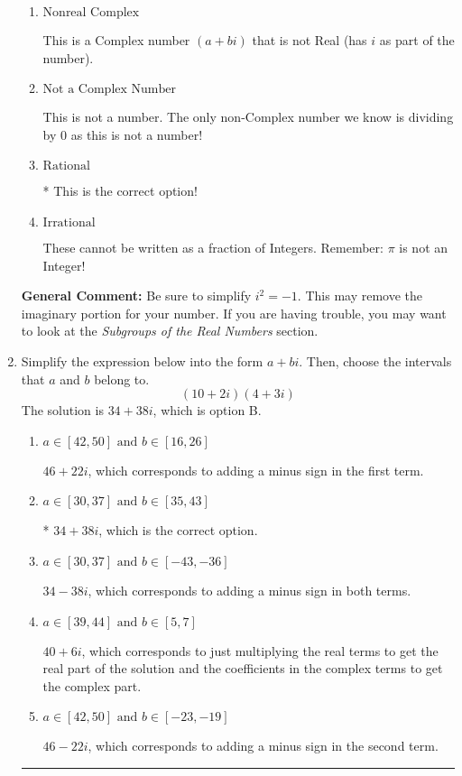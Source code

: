 \documentclass{extbook}[14pt]
\newcommand{\litem}[1]{\item #1

\rule{\textwidth}{0.4pt}}
\begin{document}
\begin{enumerate}
{\begin{enumerate}[label=\Alph*.]
This is a Complex number $(a+bi)$ that \textbf{only} has an imaginary part like $2i$.
\item \( \text{Nonreal Complex} \)

This is a Complex number $(a+bi)$ that is not Real (has $i$ as part of the number).
\item \( \text{Not a Complex Number} \)

This is not a number. The only non-Complex number we know is dividing by 0 as this is not a number!
\item \( \text{Rational} \)

* This is the correct option!
\item \( \text{Irrational} \)

These cannot be written as a fraction of Integers. Remember: $\pi$ is not an Integer!
\end{enumerate}

\textbf{General Comment:} Be sure to simplify $i^2 = -1$. This may remove the imaginary portion for your number. If you are having trouble, you may want to look at the \textit{Subgroups of the Real Numbers} section.
}
\litem{
Simplify the expression below into the form $a+bi$. Then, choose the intervals that $a$ and $b$ belong to.
\[ (10 + 2 i)(4 + 3 i) \]The solution is \( 34 + 38 i \), which is option B.\begin{enumerate}[label=\Alph*.]
\item \( a \in [42, 50] \text{ and } b \in [16, 26] \)

 $46 + 22 i$, which corresponds to adding a minus sign in the first term.
\item \( a \in [30, 37] \text{ and } b \in [35, 43] \)

* $34 + 38 i$, which is the correct option.
\item \( a \in [30, 37] \text{ and } b \in [-43, -36] \)

 $34 - 38 i$, which corresponds to adding a minus sign in both terms.
\item \( a \in [39, 44] \text{ and } b \in [5, 7] \)

 $40 + 6 i$, which corresponds to just multiplying the real terms to get the real part of the solution and the coefficients in the complex terms to get the complex part.
\item \( a \in [42, 50] \text{ and } b \in [-23, -19] \)

 $46 - 22 i$, which corresponds to adding a minus sign in the second term.
\end{enumerate}

}
\end{enumerate}
\end{document}
